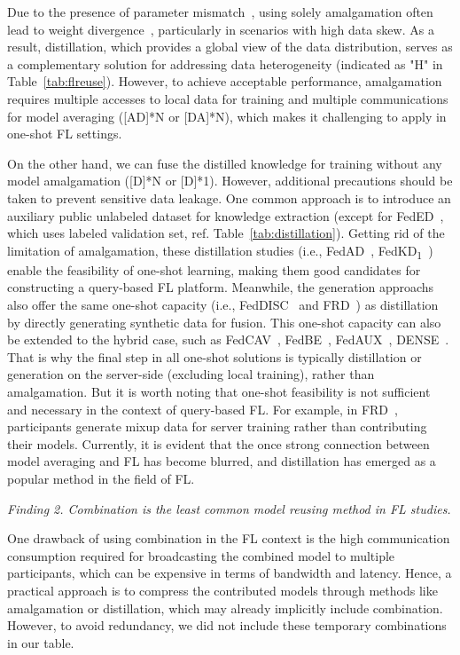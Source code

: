 Due to the presence of parameter mismatch~\cite{yu2021fed2, wang2020federated, yurochkin2019statistical}, using solely amalgamation often lead to weight divergence~\cite{Li2020On, tan2022towards}, particularly in scenarios with high data skew. 
As a result, distillation, which provides a global view of the data distribution, serves as a complementary solution for addressing data heterogeneity (indicated as "H" in Table~\ref{tab:flreuse}).
However, to achieve acceptable performance, amalgamation requires multiple accesses to local data for training and multiple communications for model averaging ([AD]*N or [DA]*N), which makes it challenging to apply in one-shot FL settings.

On the other hand, we can fuse the distilled knowledge for training without any model amalgamation ([D]*N or [D]*1).
However, additional precautions should be taken to prevent sensitive data leakage.
One common approach is to introduce an auxiliary public unlabeled dataset for knowledge extraction (except for FedED~\cite{sui2020feded}, which uses labeled validation set, ref. Table~\ref{tab:distillation}).
Getting rid of the limitation of amalgamation, these distillation studies (i.e., FedAD~\cite{gong2021ensemble}, FedKD\textsubscript{1}~\cite{gong2022preserving}) enable the feasibility of one-shot learning, making them good candidates for constructing a query-based FL platform.
Meanwhile, the generation approachs also offer the same one-shot capacity (i.e., FedDISC~\cite{yang2023exploring} and FRD~\cite{cha2019federated}) as distillation by directly generating synthetic data for fusion.
This one-shot capacity can also be extended to the hybrid case, such as FedCAV~\cite{heinbaugh2023data}, FedBE~\cite{chen2020fedbe}, FedAUX~\cite{sattler2021fedaux}, DENSE~\cite{zhang2022dense}.
That is why the final step in all one-shot solutions is typically distillation or generation on the server-side (excluding local training), rather than amalgamation.
But it is worth noting that one-shot feasibility is not sufficient and necessary in the context of query-based FL.
For example, in FRD~\cite{cha2019federated}, participants generate mixup data for server training rather than contributing their models.
Currently, it is evident that the once strong connection between model averaging and FL has become blurred, and distillation has emerged as a popular method in the field of FL.

\textit{Finding 2. Combination is the least common model reusing method in FL studies.}

One drawback of using combination in the FL context is the high communication consumption required for broadcasting the combined model to multiple participants, which can be expensive in terms of bandwidth and latency.
Hence, a practical approach is to compress the contributed models through methods like amalgamation or distillation, which may already implicitly include combination. 
However, to avoid redundancy, we did not include these temporary combinations in our table.

